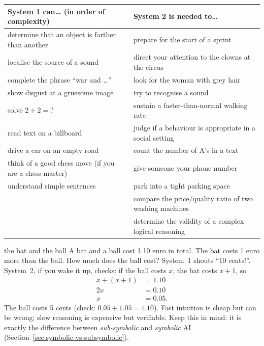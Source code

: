 \begin{center}
\small
\begin{tabularx}{\linewidth}{@{}XX@{}}
\toprule
\textbf{System 1 can\ldots{}} (in order of complexity) & \textbf{System 2 is needed to\ldots{}} \\
\midrule
determine that an object is farther than another & prepare for the start of a sprint \\
localise the source of a sound & direct your attention to the clowns at the circus \\
complete the phrase ``war and \ldots'' & look for the woman with grey hair \\
show disgust at a gruesome image & try to recognise a sound \\
solve $2+2=?$ & sustain a faster-than-normal walking rate \\
read text on a billboard & judge if a behaviour is appropriate in a social setting \\
drive a car on an empty road & count the number of A's in a text \\
think of a good chess move (if you are a chess master) & give someone your phone number \\
understand simple sentences & park into a tight parking space \\
 & compare the price/quality ratio of two washing machines \\
 & determine the validity of a complex logical reasoning \\
\bottomrule
\end{tabularx}
\end{center}

\begin{nbexample}{the bat and the ball}
\notinslides
A bat and a ball cost 1.10 euro in total. The bat costs 1 euro more than the ball. How much
does the ball cost? System~1 shouts ``10 cents!''. System~2, if you wake it up, checks:
if the ball costs $x$, the bat costs $x+1$, so
\begin{align*}
x + (x + 1) &= 1.10 \\
2x &= 0.10 \\
x &= 0.05 .
\end{align*}
The ball costs 5 cents (check: $0.05 + 1.05 = 1.10$). Fast intuition is cheap but can be
wrong; slow reasoning is expensive but verifiable. Keep this in mind: it is exactly the
difference between \emph{sub-symbolic} and \emph{symbolic} AI
(Section~\ref{sec:symbolic-vs-subsymbolic}).
\end{nbexample}

